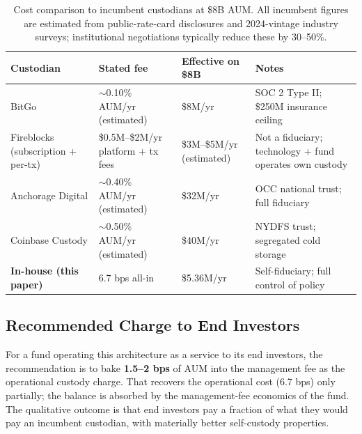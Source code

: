\begin{table}[h]
\centering
\small
\begin{tabular}{p{3.5cm}p{3.5cm}p{3.5cm}p{4cm}}
\toprule
\textbf{Custodian} & \textbf{Stated fee} & \textbf{Effective on \$8B} &
\textbf{Notes} \\
\midrule
BitGo &
$\sim$0.10\% AUM/yr (estimated) &
\$8M/yr &
SOC 2 Type II; \$250M insurance ceiling \cite{bitgo-soc} \\
Fireblocks (subscription + per-tx) &
\$0.5M--\$2M/yr platform + tx fees &
\$3M--\$5M/yr (estimated) &
Not a fiduciary; technology + fund operates own custody \cite{fireblocks} \\
Anchorage Digital &
$\sim$0.40\% AUM/yr (estimated) &
\$32M/yr &
OCC national trust; full fiduciary \cite{anchorage} \\
Coinbase Custody &
$\sim$0.50\% AUM/yr (estimated) &
\$40M/yr &
NYDFS trust; segregated cold storage \cite{coinbase-custody} \\
\textbf{In-house (this paper)} &
6.7 bps all-in &
\$5.36M/yr &
Self-fiduciary; full control of policy \\
\bottomrule
\end{tabular}
\caption{Cost comparison to incumbent custodians at \$8B AUM. All
incumbent figures are estimated from public-rate-card disclosures
and 2024-vintage industry surveys; institutional negotiations
typically reduce these by 30--50\%.}
\label{tab:cost-compare}
\end{table}

\subsection{Recommended Charge to End Investors}

For a fund operating this architecture as a service to its end
investors, the recommendation is to bake \textbf{1.5--2 bps} of AUM
into the management fee as the operational custody charge. That
recovers the operational cost (6.7 bps) only partially; the balance
is absorbed by the management-fee economics of the fund. The
qualitative outcome is that end investors pay a fraction of what
they would pay an incumbent custodian, with materially better
self-custody properties.

